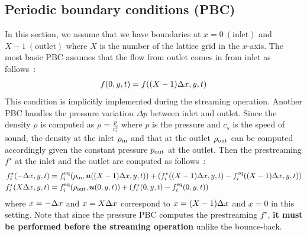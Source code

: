 \subsection{Periodic boundary conditions (PBC)}
In this section, we assume that we have
boundaries at $x = 0~(\text{inlet})$ and $X - 1~(\text{outlet})$
where $X$ is the number of the lattice grid in the $x$-axis.
The most basic PBC assumes that
the flow from outlet comes in from inlet as follows~\cite{succi2018lattice}: 
\begin{equation}
\begin{aligned}
  f(0, y, t) = f((X - 1)\Delta x, y, t)
\end{aligned}
\end{equation}
This condition is implicitly implemented during the streaming operation.
Another PBC handles
the pressure variation $\Delta p$ between inlet and outlet.
Since the density $\rho$ is computed as $\rho = \frac{p}{c_s^2}$
where $p$ is the pressure and $c_s$ is the speed of sound,
the density at the inlet $\rho_{\rm in}$ and
that at the outlet $\rho_{\rm out}$ can be computed
accordingly given the constant pressure $p_{\rm out}$
at the outlet.
Then the prestreaming $f^\star$ at 
the inlet and the outlet are computed as follows~\cite{succi2018lattice}:
\begin{equation}
\begin{aligned}
  f_i^\star(-\Delta x, y, t) &=
  f_i^{\rm eq}(\rho_{\rm in}, \boldsymbol{u}((X - 1)\Delta x, y, t))
  + (f_i^\star((X - 1)\Delta x, y, t) - f_i^{\rm eq}((X - 1)\Delta x, y, t))\\
  f_i^\star(X\Delta x, y, t) &=
  f_i^{\rm eq}(\rho_{\rm out}, \boldsymbol{u}(0, y, t))
  + (f_i^\star(0, y, t) - f_i^{\rm eq}(0, y, t))\\
\end{aligned}
\label{discretized-pbc-pressure}
\end{equation}
where $x = -\Delta x$ and $x = X\Delta x$ correspond to $x = (X - 1)\Delta x$ and $x = 0$
in this setting.
Note that since the pressure PBC computes the prestreaming $f^\star$,
{\bf it must be performed before the streaming operation} unlike the bounce-back.
